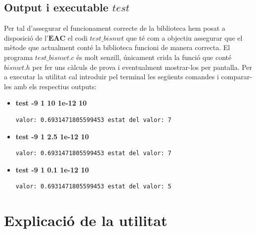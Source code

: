\documentclass[12pt]{article}
\begin{document}
\subsection{Output i executable $test$}
Per tal d'assegurar el funcionament correcte de la biblioteca hem posat a disposició de l'$\mathbf{EAC}$ el codi $test\_bisnwt$ que té com a objectiu assegurar que el mètode que actualment conté la biblioteca funcioni de manera correcta.
\newline
El programa $test\_bisnwt.c$ és molt senzill, únicament crida la funció que conté $bisnwt.h$ per fer uns càlculs de prova i eventualment mostrar-los per pantalla.
\newline
Per a executar la utilitat cal introduir pel terminal les següents comandes i comparar-les amb els respectius outputs:
\begin{itemize}
\item \textbf{test \hspace{0.5em} -9 \hspace{0.5em} 1 \hspace{0.5em} 10 \hspace{0.8em} 1e-12 \hspace{0.5em} 10}
\begin{verbatim}
valor: 0.6931471805599453 estat del valor: 7
\end{verbatim}
\item \textbf{test \hspace{0.5em} -9 \hspace{0.5em} 1 \hspace{0.5em} 2.5 \hspace{0.5em} 1e-12 \hspace{0.5em} 10}
\begin{verbatim}
valor: 0.6931471805599453 estat del valor: 7
\end{verbatim}
\item \textbf{test \hspace{0.5em} -9 \hspace{0.5em} 1 \hspace{0.5em} 0.1 \hspace{0.5em} 1e-12 \hspace{0.5em} 10}
\begin{verbatim}
valor: 0.6931471805599453 estat del valor: 5
\end{verbatim}
\end{itemize}
\newpage
\section{Explicació de la utilitat}
\end{document}
